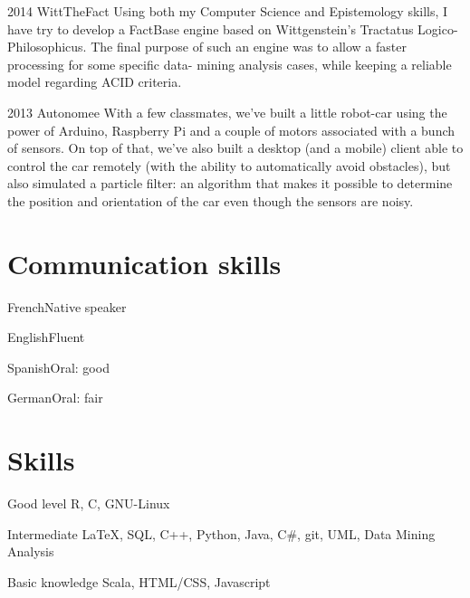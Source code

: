 \documentclass[fontsize=10pt]{tccv}
\begin{document}
\begin{list}

\item{2014}
     {WittTheFact}
     {Using both my Computer Science and Epistemology skills, I have try to develop a
     FactBase engine based on Wittgenstein’s Tractatus Logico-Philosophicus.
     The final purpose of such an engine was to allow a faster processing for some specific data-
     mining analysis cases, while keeping a reliable model regarding ACID criteria.}

\item{2013}
     {Autonomee}
     {With a few classmates, we've built a little robot-car using the power of Arduino, Raspberry
     Pi and a couple of motors associated with a bunch of sensors. On top of that, we've also
     built a desktop (and a mobile) client able to control the car remotely (with the ability to
     automatically avoid obstacles), but also simulated a particle filter: an algorithm that makes it
     possible to determine the position and orientation of the car even though the sensors are
     noisy.}

\end{list}

\section{Communication skills}

\begin{factlist}
\item{French}{Native speaker}
\item{English}{Fluent}
\item{Spanish}{Oral: good}
\item{German}{Oral: fair}
\end{factlist}

\section{Skills}

\begin{factlist}

\item{Good level}
     {R, C, GNU-Linux}

\item{Intermediate}
     {\LaTeX, SQL, C++, Python, Java, C\#, git, UML, Data Mining Analysis}

\item{Basic knowledge}
     {Scala, HTML/CSS, Javascript}

\end{factlist}
\end{document}
